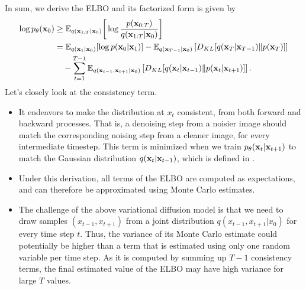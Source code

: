 In sum, we derive the ELBO and its factorized form is given by
\begin{align*}
\log p_\theta({\mathbf{x}}_0) &\geq  \mathbb{E}_{q({\mathbf{x}}_{1:T}|{\mathbf{x}}_0)}\bigg[\log\frac{p({\mathbf{x}}_{0:T})}{q({\mathbf{x}}_{1:T}|{\mathbf{x}}_0)}\bigg]\\
					  &= \mathbb{E}_{q({\mathbf{x}}_{1}|{\mathbf{x}}_0)}[\log p({\mathbf{x}}_0|{\mathbf{x}}_{1})] -\mathbb{E}_{q({\mathbf{x}}_{T-1}|{\mathbf{x}}_0)}\left[D_{KL}[ q({\mathbf{x}}_{T}|{\mathbf{x}}_{T-1}) \| p({\mathbf{x}}_T) ]\right]\\
					 &\quad - \sum_{t=1}^{T-1} \mathbb{E}_{q({\mathbf{x}}_{t-1},{\mathbf{x}}_{t+1}|{\mathbf{x}}_0)}\left[D_{KL}[q({\mathbf{x}}_{t}|{\mathbf{x}}_{t-1})\|p({\mathbf{x}}_{t}|{\mathbf{x}}_{t+1})]\right].
\end{align*}
Let's closely look at the consistency term. 
\begin{itemize}
	\item It endeavors to make the distribution at $x_t$ consistent, from both forward and backward processes. That is, a denoising step from a noisier image should match the corresponding noising step from a cleaner image, for every intermediate timestep.  This term is minimized when we train $p_\theta({\mathbf{x}}_t|{\mathbf{x}}_{t+1})$ to match the Gaussian distribution $q({\mathbf{x}}_t|{\mathbf{x}}_{t-1})$, which is defined in . 
\end{itemize}


\begin{itemize}
	\item Under this derivation, all terms of the ELBO are computed as expectations, and can therefore be approximated using Monte Carlo estimates. 
\item The challenge of the above variational diffusion model is that we need to draw samples $(x_{t-1} , x_{t+1} )$ from a joint distribution $q(x_{t-1}, x_{t+1}|x_0)$ for every time step $t$. Thus, the variance of its Monte Carlo estimate could potentially be higher than a term that is estimated using only one random variable per time step. As it is computed by summing up $T-1$ consistency terms, the final estimated value of the ELBO may have high variance for large $T$ values.
\end{itemize}

